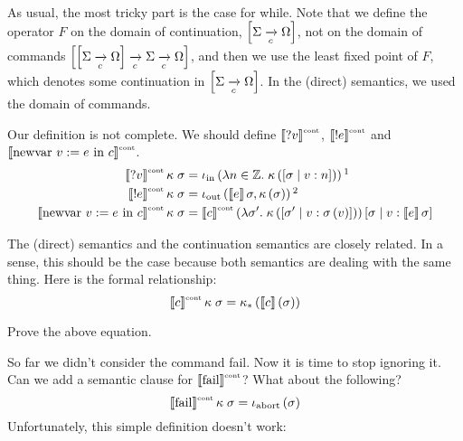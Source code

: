 \begin{enumcirc}
\begin{align*}
	\end{align*}
	As usual, the most tricky part is the case for while.
	Note that we define the operator $F$ on the domain of continuation,
	$\left[ \Sigma \xrightarrow[c]{} \Omega \right]$,
	not on the domain of commands
	$\left[ \left[ \Sigma \xrightarrow[c]{} \Omega \right] \xrightarrow[c]{} \Sigma \xrightarrow[c]{} \Omega \right]$,
	and then we use the least fixed point of $F$, which denotes some continuation
	in
	$\left[ \Sigma \xrightarrow[c]{} \Omega \right]$.
	In the (direct) semantics, we used the domain of commands.
	\item
	Our definition is not complete.
	We should define
	$\left\llbracket \textrm{?} v \right\rrbracket^{\textrm{\tiny cont}}$,
	$\left\llbracket \textrm{!} e \right\rrbracket^{\textrm{\tiny cont}}$ and
	$\left\llbracket \textrm{newvar } v := e \textrm{ in } c \right\rrbracket^{\textrm{\tiny cont}}$.
	\begin{align*}
		\supsctext{\bbrackets{\cin{v}}}{cont}\kappa\;\sigma        &
		= \iin\prths{\lambda n \in \Z.\; \kappa\prths{\aug{\sigma}{v:n}}}\footnotemark \\
		\supsctext{\bbrackets{\cout{e}}}{cont}\kappa\;\sigma       &
		= \iout\prths{\bbrackets{e}\sigma, \kappa\prths{\sigma}}\footnotemark          \\
		\supsctext{\bbrackets{\cnew{v}{e}{c}}}{cont}\kappa\;\sigma &
		= \supsctext{\bbrackets{c}}{cont}
		\prths{\lambda \sigma^\prime.\; \kappa\prths{\aug{\sigma^\prime}{v:\sigma\prths{v}}}}
		\aug{\sigma}{v: \bbrackets{e}{\sigma}}
	\end{align*}
	\item
	The (direct) semantics and the continuation semantics are closely related.
	In a sense, this should be the case because both semantics are dealing with the
	same thing.
	Here is the formal relationship:
	\[
		\left\llbracket c \right\rrbracket^{\textrm{\tiny cont}}\kappa\;\sigma =
		\kappa_* \left( \left\llbracket c \right\rrbracket\left( \sigma \right) \right)
	\]
	\begin{exercise}
		Prove the above equation.
	\end{exercise}
	\item
	So far we didn't consider the command fail.
	Now it is time to stop ignoring it.
	Can we add a semantic clause for
	$\left\llbracket \textrm{fail} \right\rrbracket^{\textrm{\tiny cont}}$?
	What about the following?
	\[
		\left\llbracket \textrm{fail} \right\rrbracket^{\textrm{\tiny cont}}\kappa\;\sigma = \iota_{\textrm{abort}}\left( \sigma \right)
	\]
	Unfortunately, this simple definition doesn't work:
	\begin{align*}

\end{align*}
\end{enumcirc}

